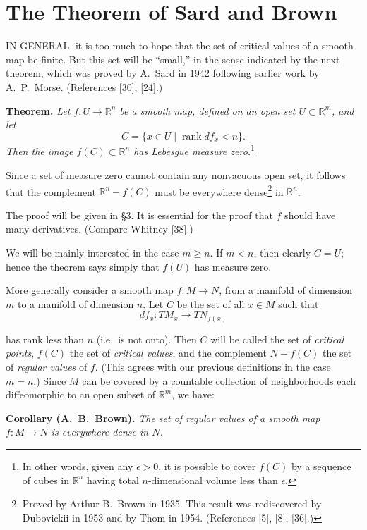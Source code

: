 
\section{The Theorem of Sard and Brown}
\label{sec:sard}

IN GENERAL, it is too much to hope that the set of critical values of a smooth map be finite. But this set will be ``small,'' in the sense indicated by the next theorem, which was proved by A.~Sard in 1942 following earlier work by A.~P.~Morse. (References [30], [24].)

\noindent\textbf{Theorem.} \textit{Let $f : U \to \mathbb{R}^n$ be a smooth map, defined on an open set $U \subset \mathbb{R}^m$, and let}
\[
C = \{x \in U \mid \operatorname{rank} df_x < n\}.
\]
\textit{Then the image $f(C) \subset \mathbb{R}^n$ has Lebesgue measure zero.}\footnote{In other words, given any $\epsilon > 0$, it is possible to cover $f(C)$ by a sequence of cubes in $\mathbb{R}^n$ having total $n$-dimensional volume less than $\epsilon$.}

Since a set of measure zero cannot contain any nonvacuous open set, it follows that the complement $\mathbb{R}^n - f(C)$ must be everywhere dense\footnote{Proved by Arthur B.~Brown in 1935. This result was rediscovered by Dubovickii in 1953 and by Thom in 1954. (References [5], [8], [36].)} in $\mathbb{R}^n$.

The proof will be given in \S3. It is essential for the proof that $f$ should have many derivatives. (Compare Whitney [38].)

We will be mainly interested in the case $m \geq n$. If $m < n$, then clearly $C = U$; hence the theorem says simply that $f(U)$ has measure zero.

More generally consider a smooth map $f : M \to N$, from a manifold of dimension $m$ to a manifold of dimension $n$. Let $C$ be the set of all $x \in M$ such that
\[
df_x : TM_x \to TN_{f(x)}
\]



has rank less than $n$ (i.e.\ is not onto). Then $C$ will be called the set of \emph{critical points}, $f(C)$ the set of \emph{critical values}, and the complement $N - f(C)$ the set of \emph{regular values} of $f$. (This agrees with our previous definitions in the case $m = n$.) Since $M$ can be covered by a countable collection of neighborhoods each diffeomorphic to an open subset of $\mathbb{R}^m$, we have:

\noindent\textbf{Corollary (A.~B.~Brown).} \textit{The set of regular values of a smooth map $f : M \to N$ is everywhere dense in $N$.}

